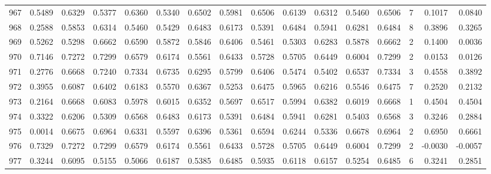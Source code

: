 \begin{tabular}{lrrrrrrrrrrrrrrr}
967 &      0.5489 &  0.6329 &  0.5377 &  0.6360 &  0.5340 &  0.6502 &  0.5981 &  0.6506 &  0.6139 &  0.6312 &   0.5460 &     0.6506 &      7 &                    0.1017 &                     0.0840 \\
968 &      0.2588 &  0.5853 &  0.6314 &  0.5460 &  0.5429 &  0.6483 &  0.6173 &  0.5391 &  0.6484 &  0.5941 &   0.6281 &     0.6484 &      8 &                    0.3896 &                     0.3265 \\
969 &      0.5262 &  0.5298 &  0.6662 &  0.6590 &  0.5872 &  0.5846 &  0.6406 &  0.5461 &  0.5303 &  0.6283 &   0.5878 &     0.6662 &      2 &                    0.1400 &                     0.0036 \\
970 &      0.7146 &  0.7272 &  0.7299 &  0.6579 &  0.6174 &  0.5561 &  0.6433 &  0.5728 &  0.5705 &  0.6449 &   0.6004 &     0.7299 &      2 &                    0.0153 &                     0.0126 \\
971 &      0.2776 &  0.6668 &  0.7240 &  0.7334 &  0.6735 &  0.6295 &  0.5799 &  0.6406 &  0.5474 &  0.5402 &   0.6537 &     0.7334 &      3 &                    0.4558 &                     0.3892 \\
972 &      0.3955 &  0.6087 &  0.6402 &  0.6183 &  0.5570 &  0.6367 &  0.5253 &  0.6475 &  0.5965 &  0.6216 &   0.5546 &     0.6475 &      7 &                    0.2520 &                     0.2132 \\
973 &      0.2164 &  0.6668 &  0.6083 &  0.5978 &  0.6015 &  0.6352 &  0.5697 &  0.6517 &  0.5994 &  0.6382 &   0.6019 &     0.6668 &      1 &                    0.4504 &                     0.4504 \\
974 &      0.3322 &  0.6206 &  0.5309 &  0.6568 &  0.6483 &  0.6173 &  0.5391 &  0.6484 &  0.5941 &  0.6281 &   0.5403 &     0.6568 &      3 &                    0.3246 &                     0.2884 \\
975 &      0.0014 &  0.6675 &  0.6964 &  0.6331 &  0.5597 &  0.6396 &  0.5361 &  0.6594 &  0.6244 &  0.5336 &   0.6678 &     0.6964 &      2 &                    0.6950 &                     0.6661 \\
976 &      0.7329 &  0.7272 &  0.7299 &  0.6579 &  0.6174 &  0.5561 &  0.6433 &  0.5728 &  0.5705 &  0.6449 &   0.6004 &     0.7299 &      2 &                   -0.0030 &                    -0.0057 \\
977 &      0.3244 &  0.6095 &  0.5155 &  0.5066 &  0.6187 &  0.5385 &  0.6485 &  0.5935 &  0.6118 &  0.6157 &   0.5254 &     0.6485 &      6 &                    0.3241 &                     0.2851 \\

\end{tabular}

